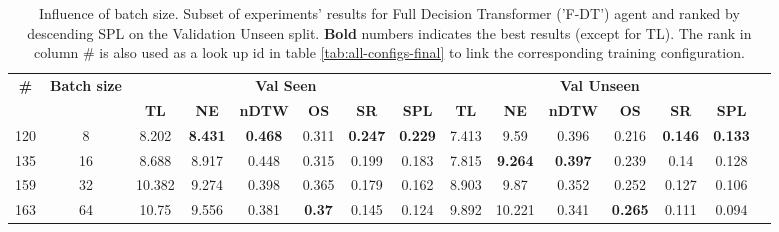 \begin{table}
\centering
\caption{\label{tab:f_dt_batch_test}Influence of batch size. Subset of experiments' results for Full Decision Transformer ('F-DT') agent and ranked by descending SPL on the Validation Unseen split. \textbf{Bold} numbers indicates the best results (except for TL). The rank in column \# is also used as a look up id in table \ref{tab:all-configs-final} to link the corresponding training configuration.}
\begin{tabular}{@{\hskip3pt}c@{\hskip3pt}c@{\hskip3pt}c@{\hskip3pt}c@{\hskip3pt}c@{\hskip3pt}c@{\hskip3pt}c@{\hskip3pt}c@{\hskip3pt}c@{\hskip3pt}c@{\hskip3pt}c@{\hskip3pt}c@{\hskip3pt}c@{\hskip3pt}c@{\hskip3pt}c}
\toprule
                                  \textbf{\#} & \textbf{Batch size} & \multicolumn{6}{c}{\textbf{Val Seen}} & \multicolumn{6}{c}{\textbf{Val Unseen}} \\
\cmidrule(l){3-8}\cmidrule(l){9-14}\textbf{~} &          \textbf{~} &       \textbf{TL} &     \textbf{NE} &   \textbf{nDTW} &    \textbf{OS} &     \textbf{SR} &    \textbf{SPL} &         \textbf{TL} &     \textbf{NE} &   \textbf{nDTW} &     \textbf{OS} &     \textbf{SR} &    \textbf{SPL} \\
\midrule
                                          120 &                   8 &             8.202 &  \textbf{8.431} &  \textbf{0.468} &          0.311 &  \textbf{0.247} &  \textbf{0.229} &               7.413 &            9.59 &           0.396 &           0.216 &  \textbf{0.146} &  \textbf{0.133} \\
                                          135 &                  16 &             8.688 &           8.917 &           0.448 &          0.315 &           0.199 &           0.183 &               7.815 &  \textbf{9.264} &  \textbf{0.397} &           0.239 &            0.14 &           0.128 \\
                                          159 &                  32 &            10.382 &           9.274 &           0.398 &          0.365 &           0.179 &           0.162 &               8.903 &            9.87 &           0.352 &           0.252 &           0.127 &           0.106 \\
                                          163 &                  64 &             10.75 &           9.556 &           0.381 &  \textbf{0.37} &           0.145 &           0.124 &               9.892 &          10.221 &           0.341 &  \textbf{0.265} &           0.111 &           0.094 \\
\bottomrule
\end{tabular}
\end{table}
